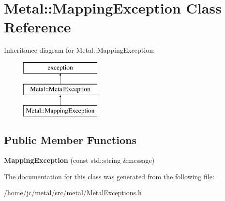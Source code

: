 \hypertarget{classMetal_1_1MappingException}{}\section{Metal\+:\+:Mapping\+Exception Class Reference}
\label{classMetal_1_1MappingException}
Inheritance diagram for Metal\+:\+:Mapping\+Exception\+:\begin{figure}[H]
\begin{center}
\leavevmode
\includegraphics[height=3.000000cm]{classMetal_1_1MappingException}
\end{center}
\end{figure}
\subsection*{Public Member Functions}
\begin{DoxyCompactItemize}
\item 
\hypertarget{classMetal_1_1MappingException_ac343b35119e5515197df087da5fceeaf}{}{\bfseries Mapping\+Exception} (const std\+::string \&message)\label{classMetal_1_1MappingException_ac343b35119e5515197df087da5fceeaf}

\end{DoxyCompactItemize}


The documentation for this class was generated from the following file\+:\begin{DoxyCompactItemize}
\item 
/home/jc/metal/src/metal/Metal\+Exceptions.\+h\end{DoxyCompactItemize}
